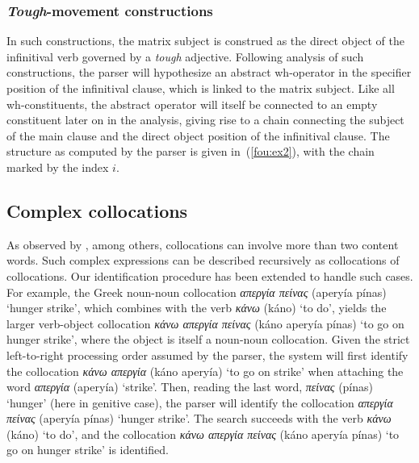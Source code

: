\documentclass[output=paper]{langsci/langscibook}
\begin{document}
\subsubsection{\textit{Tough}-movement constructions}
In such constructions, the matrix subject is construed as the direct object of the infinitival verb governed by a \textit{tough} adjective. Following  analysis of such constructions, the parser will hypothesize an abstract wh-operator in the specifier position of the infinitival clause, which is linked to the matrix subject. Like all wh-constituents, the abstract operator will itself be connected to an empty constituent later on in the analysis, giving rise to a chain connecting the subject of the main clause and the direct object position of the infinitival clause. The structure as computed by the parser is given in~(\ref{fou:ex2}), with the chain marked by the index $i$.

\ea\label{fou:ex2}
{\small {} }
\z

\subsection{Complex collocations}
As observed by \cite{heid94}, among others, collocations can involve more than two content words. Such complex expressions can be described recursively as collocations of collocations. Our identification procedure has been extended to handle such cases. For example, the Greek noun-noun collocation \textit{απεργία πείνας} (aperyía pínas) `hunger strike', which combines with the verb \textit{κάνω} (káno) `to do', yields the larger verb-object collocation \textit{κάνω απεργία πείνας} (káno aperyía pínas) `to go on hunger strike', where the object is itself a noun-noun collocation. Given the strict left-to-right processing order assumed by the parser, the system will first identify the collocation \textit{κάνω απεργία} (káno aperyía) `to go on strike' when attaching the word \textit{απεργία} (aperyía) `strike'. Then, reading the last word, \textit{πείνας} (pínas) `hunger' (here in genitive case), the parser will identify the collocation \textit{απεργία πείνας} (aperyía pínas) `hunger strike'. The search succeeds with the verb \textit{κάνω} (káno) `to do', and the collocation \textit{κάνω απεργία πείνας} (káno aperyía pínas) `to go on hunger strike' is identified.
\end{document}
